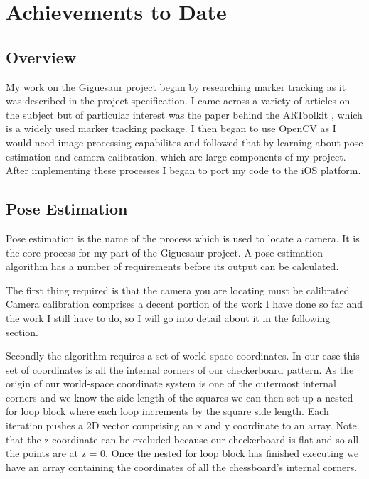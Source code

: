 \documentclass{article}
\begin{document}
\section{Achievements to Date}

\subsection{Overview}

My work on the Giguesaur project began by researching marker tracking as it was described in the project specification. I came across a variety of articles on the subject but of particular interest was the paper behind the ARToolkit \cite{artoolkit}, which is a widely used marker tracking package. I then began to use OpenCV as I would need image processing capabilites and followed that by learning about pose estimation and camera calibration, which are large components of my project. After implementing these processes I began to port my code to the iOS platform. 

\subsection{Pose Estimation}

Pose estimation is the name of the process which is used to locate a camera. It is the core process for my part of the Giguesaur project. A pose estimation algorithm has a number of requirements before its output can be calculated. \par

The first thing required is that the camera you are locating must be calibrated. Camera calibration comprises a decent portion of the work I have done so far and the work I still have to do, so I will go into detail about it in the following section. \par

Secondly the algorithm requires a set of world-space coordinates. In our case this set of coordinates is all the internal corners of our checkerboard pattern. As the origin of our world-space coordinate system is one of the outermost internal corners and we know the side length of the squares we can then set up a nested for loop block where each loop increments by the square side length. Each iteration pushes a 2D vector comprising an x and y coordinate to an array. Note that the z coordinate can be excluded because our checkerboard is flat and so all the points are at z = 0. Once the nested for loop block has finished executing we have an array containing the coordinates of all the chessboard's internal corners. \par
\end{document}
